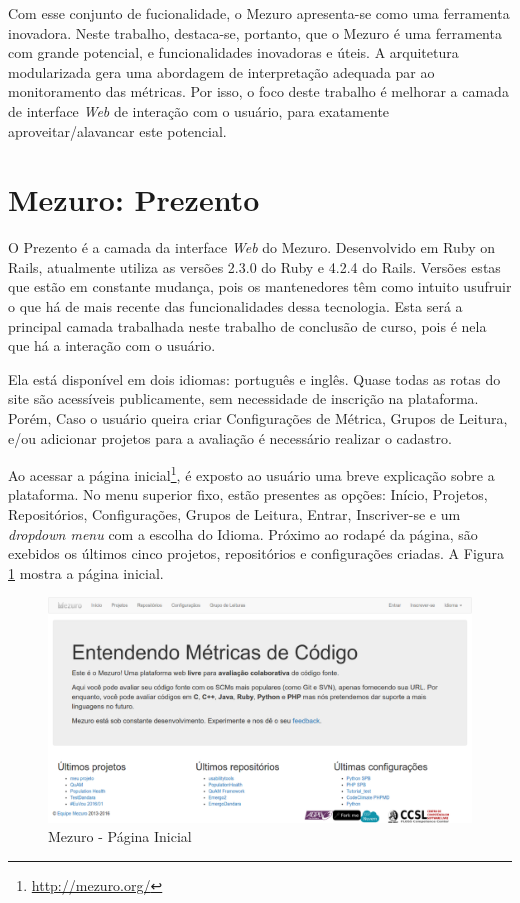 Com esse conjunto de fucionalidade, o Mezuro apresenta-se como uma ferramenta
inovadora. Neste trabalho, destaca-se, portanto, que o Mezuro é uma ferramenta
com grande potencial, e funcionalidades inovadoras e úteis. A arquitetura
modularizada gera uma abordagem de interpretação adequada par ao monitoramento
das métricas. Por isso, o foco deste trabalho é melhorar a camada de interface
\textit{Web} de interação com o usuário, para exatamente aproveitar/alavancar este
potencial.

\section{Mezuro: Prezento}

O Prezento é a camada da interface \textit{Web} do
Mezuro. Desenvolvido em Ruby on Rails, atualmente utiliza as versões 2.3.0 do
Ruby e 4.2.4 do Rails. Versões estas que estão em constante mudança, pois os
mantenedores têm como intuito usufruir o que há de mais recente das funcionalidades
dessa tecnologia. Esta será a principal camada trabalhada neste trabalho de
conclusão de curso, pois é nela que há a interação com o usuário.

Ela está disponível em dois idiomas: português e inglês. Quase todas as rotas
do site são acessíveis publicamente, sem necessidade de inscrição na plataforma.
Porém, Caso o usuário queira criar Configurações de Métrica, Grupos de Leitura,
e/ou adicionar projetos para a avaliação é necessário realizar o cadastro.

Ao acessar a página inicial\footnote{\url{http://mezuro.org/}}, é exposto ao
usuário uma breve explicação sobre a plataforma. No menu superior fixo, estão
presentes as opções: Início, Projetos, Repositórios, Configurações, Grupos de
Leitura, Entrar, Inscriver-se e um \textit{dropdown menu} com a escolha do
Idioma. Próximo ao rodapé da página, são exebidos os últimos cinco projetos,
repositórios e configurações criadas. A Figura \ref{fig:mezuro-homepage}
mostra a página inicial.

\begin{figure}[!htb]
	\centering
    \includegraphics[keepaspectratio=true,scale=0.3]
    {figuras/mezuro-homepage.eps}
  \caption{Mezuro - Página Inicial}
	\label{fig:mezuro-homepage}
\end{figure}

